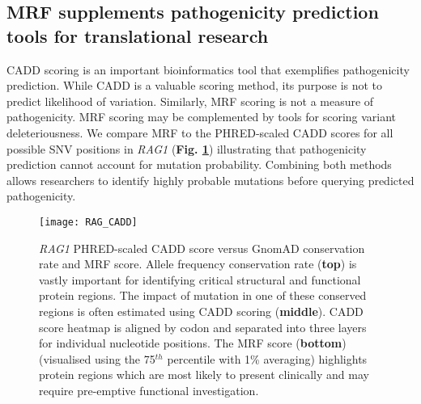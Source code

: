\documentclass[preprint,11pt,fleqn]{elsarticle}
\begin{document}
\subsection*{\textbf{MRF supplements pathogenicity prediction tools for translational research}}
\noindent CADD scoring \citep{kircher2014general} is an important bioinformatics tool that exemplifies pathogenicity prediction.
While CADD is a valuable scoring method, its purpose is not to predict likelihood of variation.
Similarly, MRF scoring is not a measure of pathogenicity. 
MRF scoring may be complemented by tools for scoring variant deleteriousness.
We compare MRF to the PHRED-scaled CADD scores for all possible SNV positions in \textit{RAG1}
(\textbf{Fig. \ref{fig:RAG_CADD}}) illustrating that pathogenicity prediction cannot account for mutation probability.
Combining both methods allows researchers to identify highly probable mutations before querying predicted pathogenicity.

\begin{figure}[h]
\hspace*{0.4cm}   %
	\texttt{[image: RAG\_CADD]}
	\caption{\textit{RAG1} PHRED-scaled CADD score versus GnomAD conservation rate and MRF score. 
Allele frequency conservation rate (\textbf{top}) is vastly important for identifying critical structural and functional protein regions. 
The impact of mutation in one of these conserved regions is often estimated using CADD scoring (\textbf{middle}). 
CADD score heatmap is aligned by codon and separated into three layers for individual nucleotide positions.
The MRF score (\textbf{bottom})(visualised using the 75$^{th}$ percentile with 1\% averaging) highlights protein regions which are most likely to present clinically and may require pre-emptive functional investigation.}
	\label{fig:RAG_CADD}
\end{figure}
\end{document}
